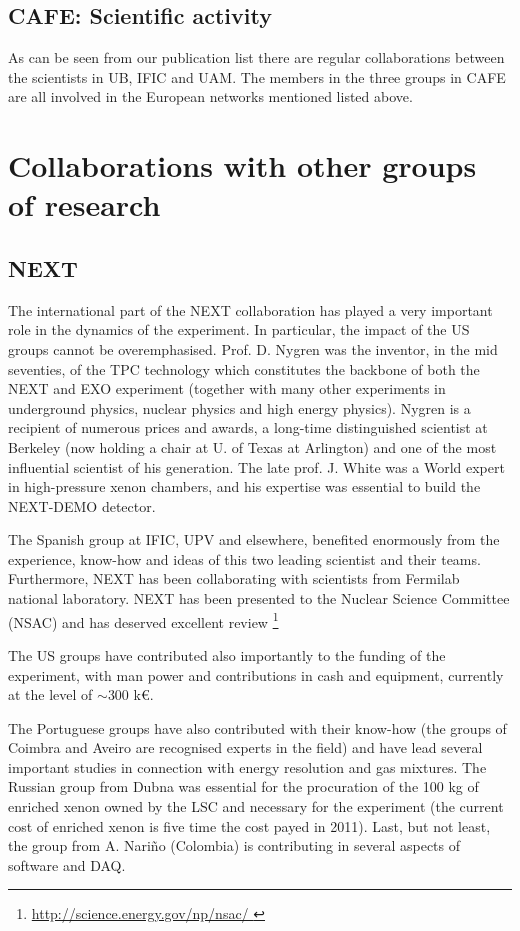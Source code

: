 \documentclass[a4paper,11pt,oneside]{article}
\begin{document}
\subsection*{CAFE: Scientific activity}

As can be seen from our publication list there are regular
collaborations between the scientists in UB, IFIC and UAM. 
The members in the three groups in CAFE are all involved in the European
networks mentioned listed above. 


\section{\bf \textsf{Collaborations with other groups of research}}
\label{sec.others}


\subsection*{NEXT}

The international part of the NEXT collaboration has played a very important role in the dynamics of the experiment. In particular, the impact of the US groups cannot be overemphasised. Prof. D. Nygren was the inventor, in the mid seventies, of the TPC technology which constitutes the backbone of both the NEXT and EXO experiment (together with many other experiments in underground physics, nuclear physics and high energy physics). Nygren is a recipient of numerous prices and awards, a long-time distinguished scientist at Berkeley (now holding a chair at U. of Texas at Arlington) and one of the most influential scientist of his generation. The late prof. J. White was a World expert in high-pressure xenon chambers, and his expertise was essential to build the NEXT-DEMO detector.

The Spanish group at IFIC, UPV and elsewhere, benefited enormously from the experience, know-how and ideas of this two leading scientist and their teams. Furthermore, NEXT has been collaborating with scientists from Fermilab national laboratory. NEXT has been presented to the Nuclear Science Committee (NSAC) and has deserved excellent review
\footnote{\url{http://science.energy.gov/np/nsac/
}}

The US groups have contributed also importantly to the funding of the experiment, with man power and contributions in cash and equipment, currently at the level of $\sim$300 k\euro. 

The Portuguese groups have also contributed with their know-how (the groups of Coimbra and Aveiro are recognised experts in the field) and have lead several important studies in connection with energy resolution and gas mixtures. The Russian group from Dubna was essential for the procuration of the 100 kg of enriched xenon owned by the LSC and necessary for the experiment (the current cost of enriched xenon is five time the cost payed in 2011). Last, but not least, the group from A. Nari\~no (Colombia) is contributing in several aspects of software and DAQ. 
\end{document}
